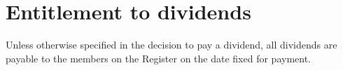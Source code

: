 \section{Entitlement to dividends}

Unless otherwise specified in the decision to pay a dividend, all dividends are payable to the members on the Register on the date fixed for payment. 